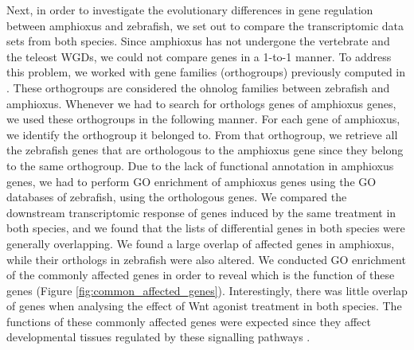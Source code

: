 Next, in order to investigate the evolutionary differences in gene regulation between amphioxus and zebrafish, we set out to compare the transcriptomic data sets from both species. Since amphioxus has not undergone the vertebrate and the teleost WGDs, we could not compare genes in a 1-to-1 manner. To address this problem, we worked with gene families (orthogroups) previously computed in \parencite{marletaz_amphioxus_2018}. These orthogroups are considered the ohnolog families between zebrafish and amphioxus. Whenever we had to search for orthologs genes of amphioxus genes, we used these orthogroups in the following manner. For each gene of amphioxus, we identify the orthogroup it belonged to. From that orthogroup, we retrieve all the zebrafish genes that are orthologous to the amphioxus gene since they belong to the same orthogroup. Due to the lack of functional annotation in amphioxus genes, we had to perform GO enrichment of amphioxus genes using the GO databases of zebrafish, using the orthologous genes. We compared the downstream transcriptomic response of genes induced by the same treatment in both species, and we found that the lists of differential genes in both species were generally overlapping. We found a large overlap of affected genes in amphioxus, while their orthologs in zebrafish were also altered. We conducted GO enrichment of the commonly affected genes in order to reveal which is the function of these genes (Figure \ref{fig:common_affected_genes}). Interestingly, there was little overlap of genes when analysing the effect of Wnt agonist treatment in both species. The functions of these commonly affected genes were expected since they affect developmental tissues regulated by these signalling pathways \parencite{bertrand_developmental_2017, kiecker_molecular_2016, tuazon_temporally_2015}.


